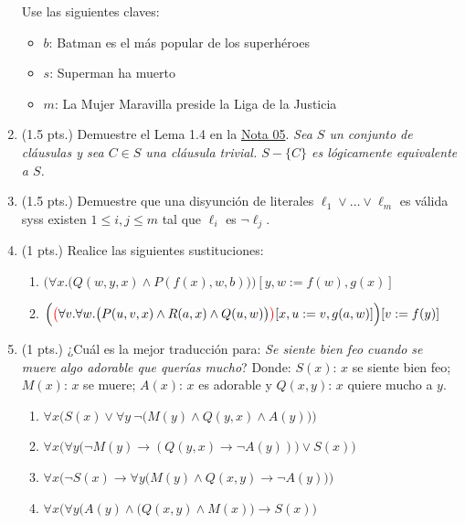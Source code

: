 \documentclass[12pt,letterpaper]{article}
\newcommand{\imp}{\rightarrow}
\begin{document}
\begin{enumerate}
Use las siguientes claves:
\begin{itemize}[label={--}]
    \item $b$: Batman es el más popular de los superhéroes
    \item $s$: Superman ha muerto
    \item $m$: La Mujer Maravilla preside la Liga de la Justicia
\end{itemize}

\item (1.5 pts.) Demuestre el Lema 1.4 en la \href{https://drive.google.com/file/d/1neZfLRMBIsvz2ZycHT0h7z0lKTuAe6pv/view}{Nota 05}. \emph{Sea $S$ un conjunto de cláusulas y sea $C\in S$ una cláusula trivial. $S-\{C\}$ es lógicamente equivalente a $S$.}


\item (1.5 pts.) Demuestre que una disyunción de literales $\ell_1 \vee \ldots \vee \ell_m$ es válida syss existen $1\leq i, j \leq m$ tal que $\ell_i$ es $\neg\ell_j$.


\item (1 pts.) Realice las siguientes sustituciones:
\begin{enumerate}
\item $\Big(\forall x .\big( Q(w,y,x) \wedge P(f(x),w,b) \big) \Big)[y,w:=f(w),g(x)]$
\item $\Big(\begingroup\colorlet{savedleftcolor}{.}\color{red}\big(\color{savedleftcolor}\forall v .\forall w . \big( P (u, v, x) \wedge R(a, x) \wedge Q(u, w) \big)\color{red}\big)\endgroup [x, u := v, g(a, w)]\Big)[v:=f(y)]$
\end{enumerate}


\item (1 pts.) ¿Cuál es la mejor traducción para: {\em Se siente bien feo cuando se muere algo adorable que querías mucho}? Donde: $S(x)$: $x$ se siente bien feo;  $M(x)$: $x$ se muere; $A(x)$: $x$ es adorable y $Q(x,y)$: $x$ quiere mucho a $y$.
	\begin{enumerate}
	\item $\forall x\Big(S(x)\vee \forall y\ \neg\big(M(y)\wedge Q(y,x)\wedge A(y)\big)\Big)$
	\item $\forall x\Big(\forall y \big(\neg M(y)\imp (Q(y,x)\imp \neg A(y))\big)\vee S(x)\Big)$
	\item $\forall x\Big(\neg S(x) \imp \forall y \big(M(y)\wedge Q(x,y)\imp\neg A(y)\big)\Big)$
	\item $\forall x\Big(\forall y\big(A(y)\wedge( Q(x,y) \wedge M(x)\big)\imp S(x)\Big)$
	\end{enumerate}


\end{enumerate}
\end{document}
